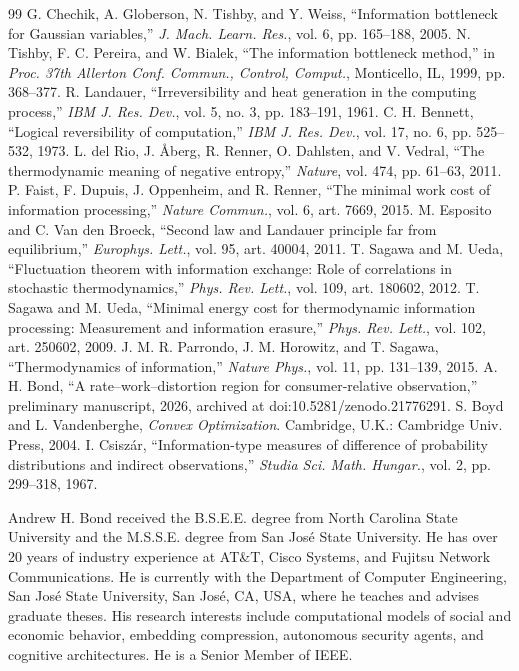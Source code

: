 \documentclass[11pt,onecolumn]{IEEEtran}
\begin{document}
\begin{thebibliography}{99}
 G. Chechik, A. Globerson, N. Tishby, and Y. Weiss,
``Information bottleneck for Gaussian variables,'' \emph{J. Mach. Learn.
Res.}, vol. 6, pp. 165--188, 2005.
 N. Tishby, F. C. Pereira, and W. Bialek, ``The
information bottleneck method,'' in \emph{Proc. 37th Allerton Conf. Commun.,
Control, Comput.}, Monticello, IL, 1999, pp. 368--377.
 R. Landauer, ``Irreversibility and heat generation in
the computing process,'' \emph{IBM J. Res. Dev.}, vol. 5, no. 3, pp. 183--191,
1961.
 C. H. Bennett, ``Logical reversibility of computation,''
\emph{IBM J. Res. Dev.}, vol. 17, no. 6, pp. 525--532, 1973.
 L. del Rio, J. \AA berg, R. Renner, O. Dahlsten, and
V. Vedral, ``The thermodynamic meaning of negative entropy,'' \emph{Nature},
vol. 474, pp. 61--63, 2011.
 P. Faist, F. Dupuis, J. Oppenheim, and R. Renner, ``The
minimal work cost of information processing,'' \emph{Nature Commun.}, vol. 6,
art. 7669, 2015.
 M. Esposito and C. Van den Broeck, ``Second law and
Landauer principle far from equilibrium,'' \emph{Europhys. Lett.}, vol. 95,
art. 40004, 2011.
 T. Sagawa and M. Ueda, ``Fluctuation theorem with
information exchange: Role of correlations in stochastic thermodynamics,''
\emph{Phys. Rev. Lett.}, vol. 109, art. 180602, 2012.
 T. Sagawa and M. Ueda, ``Minimal energy cost for
thermodynamic information processing: Measurement and information
erasure,'' \emph{Phys. Rev. Lett.}, vol. 102, art. 250602, 2009.
 J. M. R. Parrondo, J. M. Horowitz, and T. Sagawa,
``Thermodynamics of information,'' \emph{Nature Phys.}, vol. 11,
pp. 131--139, 2015.
 A. H. Bond, ``A rate--work--distortion region for
consumer-relative observation,'' preliminary manuscript, 2026, archived at
doi:10.5281/zenodo.21776291.
 S. Boyd and L. Vandenberghe, \emph{Convex Optimization}.
Cambridge, U.K.: Cambridge Univ. Press, 2004.
 I. Csisz\'ar, ``Information-type measures of difference
of probability distributions and indirect observations,'' \emph{Studia Sci.
Math. Hungar.}, vol. 2, pp. 299--318, 1967.
\end{thebibliography}

\begin{IEEEbiographynophoto}{Andrew H. Bond}
received the B.S.E.E. degree from North Carolina State University and the M.S.S.E. degree from San Jos\'{e} State University. He has over 20 years of industry experience at AT\&T, Cisco Systems, and Fujitsu Network Communications. He is currently with the Department of Computer Engineering, San Jos\'{e} State University, San Jos\'{e}, CA, USA, where he teaches and advises graduate theses. His research interests include computational models of social and economic behavior, embedding compression, autonomous security agents, and cognitive architectures. He is a Senior Member of IEEE.
\end{IEEEbiographynophoto}
\end{document}
